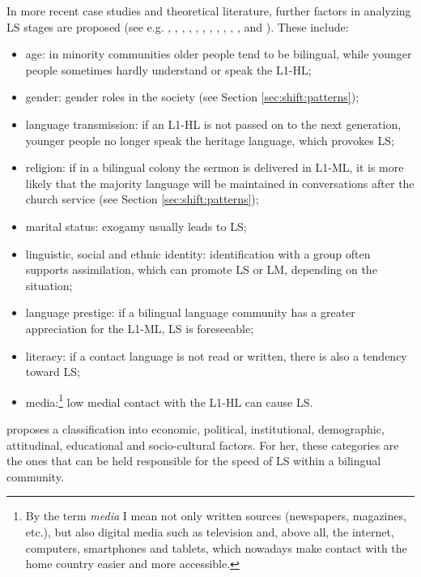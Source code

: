 \documentclass[output=paper]{langscibook}
\begin{document}
In more recent case studies and theoretical literature, further factors in analyzing LS stages are proposed (see e.g. \cite{Lutz2006}, \cite{Ortman2008}, \cite{Bohm2010}, \cite{Jagodic2011}, \cite{Ostler2011}, \cite{Sağlamel2013}, \cite{Heinrich2015}, \cite{Pauwels2016}, \cite{Perez2016}, \cite{Puthuval2017}, \cite{VanRijk2017}, and \cite{Karnopp}). These include:

\begin{itemize}
\item age: in minority communities older people tend to be bilingual, while younger people sometimes hardly understand or speak the L1-HL; 
\item gender: gender roles in the society (see Section \ref{sec:shift:patterns});
\item language transmission: if an L1-HL is not passed on to the next generation, younger people no longer speak the heritage language, which provokes LS; 
\item religion: if in a bilingual colony the sermon is delivered in L1-ML, it is more likely that the majority language will be maintained in conversations after the church service (see Section \ref{sec:shift:patterns});
\item marital status: exogamy usually leads to LS; 
\item linguistic, social and ethnic identity: identification with a group often supports assimilation, which can promote LS or LM, depending on the situation; 
\item language prestige: if a bilingual language community has a greater appreciation for the L1-ML, LS is foreseeable; 
\item literacy: if a contact language is not read or written, there is also a tendency toward LS; 
\item media:\footnote{By the term \emph{media} I mean not only written sources (newspapers, magazines, etc.), but also digital media such as television and, above all, the internet, computers, smartphones and tablets, which nowadays make contact with the home country easier and more accessible.} low medial contact with the L1-HL can cause LS.
\end{itemize}

\textcite{Holmes2013} proposes a classification into economic, political, institutional, demographic, attitudinal, educational and socio-cultural factors. For her, these categories are the ones that can be held responsible for the speed of LS within a bilingual community.
\end{document}
